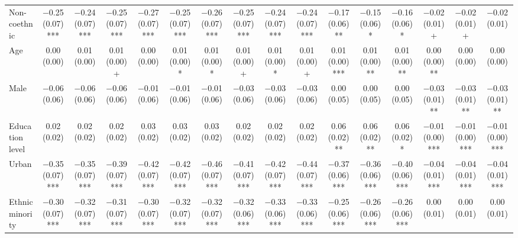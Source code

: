 \begin{table}[H]
\begin{tabular}[t]{lccccccccccccccc}
Non-coethnic & \num{-0.25} (\num{0.07})*** & \num{-0.24} (\num{0.07})*** & \num{-0.25} (\num{0.07})*** & \num{-0.27} (\num{0.07})*** & \num{-0.25} (\num{0.07})*** & \num{-0.26} (\num{0.07})*** & \num{-0.25} (\num{0.07})*** & \num{-0.24} (\num{0.07})*** & \num{-0.24} (\num{0.07})*** & \num{-0.17} (\num{0.06})** & \num{-0.15} (\num{0.06})* & \num{-0.16} (\num{0.06})* & \num{-0.02} (\num{0.01})+ & \num{-0.02} (\num{0.01})+ & \num{-0.02} (\num{0.01})\\
Age & \num{0.00} (\num{0.00}) & \num{0.01} (\num{0.00}) & \num{0.01} (\num{0.00})+ & \num{0.00} (\num{0.00}) & \num{0.01} (\num{0.00})* & \num{0.01} (\num{0.00})* & \num{0.01} (\num{0.00})+ & \num{0.01} (\num{0.00})* & \num{0.01} (\num{0.00})+ & \num{0.01} (\num{0.00})*** & \num{0.01} (\num{0.00})** & \num{0.01} (\num{0.00})** & \num{0.00} (\num{0.00})** & \num{0.00} (\num{0.00}) & \num{0.00} (\num{0.00})\\
Male & \num{-0.06} (\num{0.06}) & \num{-0.06} (\num{0.06}) & \num{-0.06} (\num{0.06}) & \num{-0.01} (\num{0.06}) & \num{-0.01} (\num{0.06}) & \num{-0.01} (\num{0.06}) & \num{-0.03} (\num{0.06}) & \num{-0.03} (\num{0.06}) & \num{-0.03} (\num{0.06}) & \num{0.00} (\num{0.05}) & \num{0.00} (\num{0.05}) & \num{0.00} (\num{0.05}) & \num{-0.03} (\num{0.01})** & \num{-0.03} (\num{0.01})** & \num{-0.03} (\num{0.01})**\\
Education level & \num{0.02} (\num{0.02}) & \num{0.02} (\num{0.02}) & \num{0.02} (\num{0.02}) & \num{0.03} (\num{0.02}) & \num{0.03} (\num{0.02}) & \num{0.03} (\num{0.02}) & \num{0.02} (\num{0.02}) & \num{0.02} (\num{0.02}) & \num{0.02} (\num{0.02}) & \num{0.06} (\num{0.02})** & \num{0.06} (\num{0.02})** & \num{0.06} (\num{0.02})* & \num{-0.01} (\num{0.00})*** & \num{-0.01} (\num{0.00})*** & \num{-0.01} (\num{0.00})***\\
Urban & \num{-0.35} (\num{0.07})*** & \num{-0.35} (\num{0.07})*** & \num{-0.39} (\num{0.07})*** & \num{-0.42} (\num{0.07})*** & \num{-0.42} (\num{0.07})*** & \num{-0.46} (\num{0.07})*** & \num{-0.41} (\num{0.07})*** & \num{-0.42} (\num{0.07})*** & \num{-0.44} (\num{0.07})*** & \num{-0.37} (\num{0.06})*** & \num{-0.36} (\num{0.06})*** & \num{-0.40} (\num{0.06})*** & \num{-0.04} (\num{0.01})*** & \num{-0.04} (\num{0.01})*** & \num{-0.04} (\num{0.01})***\\
Ethnic minority & \num{-0.30} (\num{0.07})*** & \num{-0.32} (\num{0.07})*** & \num{-0.31} (\num{0.07})*** & \num{-0.30} (\num{0.07})*** & \num{-0.32} (\num{0.07})*** & \num{-0.32} (\num{0.07})*** & \num{-0.32} (\num{0.06})*** & \num{-0.33} (\num{0.06})*** & \num{-0.33} (\num{0.06})*** & \num{-0.25} (\num{0.06})*** & \num{-0.26} (\num{0.06})*** & \num{-0.26} (\num{0.06})*** & \num{0.00} (\num{0.01}) & \num{0.00} (\num{0.01}) & \num{0.00} (\num{0.01})\\

\end{tabular}
\end{table}
